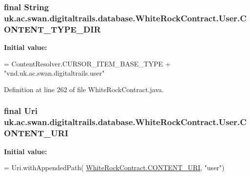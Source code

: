 \hypertarget{classuk_1_1ac_1_1swan_1_1digitaltrails_1_1database_1_1_white_rock_contract_1_1_user_aaed02407aa17f480398793178acda360}{
\subsubsection[{C\+O\+N\+T\+E\+N\+T\+\_\+\+T\+Y\+P\+E\+\_\+\+D\+I\+R}]{\setlength{\rightskip}{0pt plus 5cm}final String uk.\+ac.\+swan.\+digitaltrails.\+database.\+White\+Rock\+Contract.\+User.\+C\+O\+N\+T\+E\+N\+T\+\_\+\+T\+Y\+P\+E\+\_\+\+D\+I\+R\hspace{0.3cm}{\ttfamily [static]}}}\label{classuk_1_1ac_1_1swan_1_1digitaltrails_1_1database_1_1_white_rock_contract_1_1_user_aaed02407aa17f480398793178acda360}
{\bfseries Initial value\+:}
\begin{DoxyCode}
= ContentResolver.CURSOR\_ITEM\_BASE\_TYPE +
                \textcolor{stringliteral}{"vnd.uk.ac.swan.digitaltrails.user"}
\end{DoxyCode}


Definition at line 262 of file White\+Rock\+Contract.\+java.

\hypertarget{classuk_1_1ac_1_1swan_1_1digitaltrails_1_1database_1_1_white_rock_contract_1_1_user_a66e36a1bfe98d6316b8f38f48deb21ae}{
\subsubsection[{C\+O\+N\+T\+E\+N\+T\+\_\+\+U\+R\+I}]{\setlength{\rightskip}{0pt plus 5cm}final Uri uk.\+ac.\+swan.\+digitaltrails.\+database.\+White\+Rock\+Contract.\+User.\+C\+O\+N\+T\+E\+N\+T\+\_\+\+U\+R\+I\hspace{0.3cm}{\ttfamily [static]}}}\label{classuk_1_1ac_1_1swan_1_1digitaltrails_1_1database_1_1_white_rock_contract_1_1_user_a66e36a1bfe98d6316b8f38f48deb21ae}
{\bfseries Initial value\+:}
\begin{DoxyCode}
= Uri.withAppendedPath(
                \hyperlink{classuk_1_1ac_1_1swan_1_1digitaltrails_1_1database_1_1_white_rock_contract_abfe96759bfe16773a98099536eef2306}{WhiteRockContract.CONTENT\_URI}, \textcolor{stringliteral}{"user"})
\end{DoxyCode}


